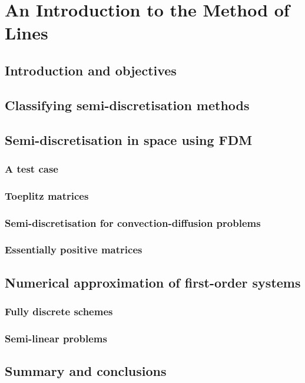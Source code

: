 \chapter{An Introduction to the Method of Lines}

\section{Introduction and objectives}

\section{Classifying semi-discretisation methods}

\section{Semi-discretisation in space using FDM}

\subsection{A test case}

\subsection{Toeplitz matrices}

\subsection{Semi-discretisation for convection-diffusion problems}

\subsection{Essentially positive matrices}

\section{Numerical approximation of first-order systems}

\subsection{Fully discrete schemes}

\subsection{Semi-linear problems}

\section{Summary and conclusions}